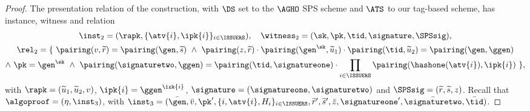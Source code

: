 \begin{proof}

    The presentation relation of the construction, with $\DS$ set to the
$\AGHO$ SPS scheme and $\ATS$ to our tag-based scheme, has instance, witness and
relation
%
    \begin{equation*}\begin{gathered}
%
      \inst_2 = (\rapk, \{\atv{i}, \ipk{i}\}_{i \in \ISSUERS}), \quad \witness_2
= (\sk, \pk, \tid, \signature, \SPSsig), \\
%
      \rel_2 = \{\ \pairing(v, \widetilde{r}) = \pairing(\gen, \widetilde{s}) \
\wedge\ \pairing(z, \widetilde{r}) \cdot \pairing(\gen^\sk,
\widetilde{u}_1)\cdot \pairing(\tid, \widetilde{u}_2) = \pairing(\gen, \ggen) \\
      \wedge\ \pk = \gen^\sk \ \wedge\ \pairing(\signaturetwo, \ggen) =
\pairing(\tid,
\signatureone)\cdot\prod_{i\in\ISSUERS}\pairing(\hashone(\atv{i}), \ipk{i})\ \},
%
    \end{gathered}\end{equation*}
%
with $\rapk = (\widetilde{u}_1, \widetilde{u}_2, v)$, $\ipk{i} = \ggen^{\isk{i}}$,
$\signature = (\signatureone, \signaturetwo)$ and $\SPSsig = (\widetilde{r},
\widetilde{s}, z)$. Recall that $\algoproof = (\eta, \inst_3)$, with $\inst_3 = (\bar{\gen},
\bar{v}, \pk', \{i, \atv{i}, H_i\}_{i\in\ISSUERS}, \widetilde{r}',
\widetilde{s}', \bar{z}, \signatureone', \bar{\signaturetwo}, \bar{\tid})$.


\end{proof}
